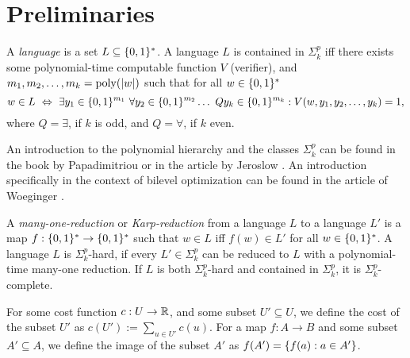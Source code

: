 \section{Preliminaries}
\label{sec:prelim}

A \emph{language} is a set $L\subseteq \{ 0,1 \}^*$.
A language $L$ is contained in $\Sigma^p_k$ iff there exists some polynomial-time computable function $V$ (verifier), and $m_1,m_2,\ldots, m_k = \operatorname{poly}(|w|)$ such that for all $w \in \{ 0,1 \}^*$
\[
    w \in L \ \Leftrightarrow \ \exists y_1 \in \set{0,1}^{m_1} \ \forall y_2 \in \set{0,1}^{m_2} \ldots \ Q y_k \in \set{0,1}^{m_k}: V(w,y_1,y_2,\ldots,y_k) = 1,
\]
where $Q = \exists$, if $k$ is odd, and $Q = \forall$, if $k$ even.

An introduction to the polynomial hierarchy and the classes $\Sigma^p_k$ can be found in the book by Papadimitriou \cite{DBLP:books/daglib/0072413} or in the article by Jeroslow \cite{DBLP:journals/mp/Jeroslow85}.
An introduction specifically in the context of bilevel optimization can be found in the article of Woeginger \cite{DBLP:journals/4or/Woeginger21}.

A \emph{many-one-reduction} or \emph{Karp-reduction} from a language $L$ to a language $L'$ is a map $f : \{ 0,1 \}^* \to \{ 0,1 \}^*$ such that $w \in L$ iff $f(w) \in L'$ for all $w \in \{ 0,1 \}^*$. 
A language $L$ is $\Sigma^p_k$-hard, if every $L' \in \Sigma^p_k$ can be reduced to $L$ with a polynomial-time many-one reduction. If $L$ is both $\Sigma^p_k$-hard and contained in $\Sigma^p_k$, it is $\Sigma^p_k$-complete.

For some cost function $c : U \to \mathbb{R}$, and some subset $U' \subseteq U$, we define the cost of the subset $U'$ as $c(U') := \sum_{u \in U'} c(u)$. For a map $f : A \to B$ and some subset $A' \subseteq A$, we define the image of the subset $A'$ as $f(A') = \{ f(a) : a \in A' \}$.